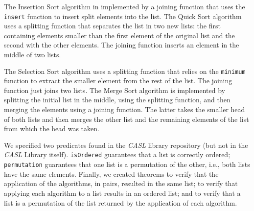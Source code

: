 \documentclass[12pt,twoside]{article}
\numberwithin{spec}{subsection}
\numberwithin{proof}{subsection}
\numberwithin{figure}{subsection}
\numberwithin{code}{subsection}
\begin{document}
The Insertion Sort algorithm in implemented by a joining function that uses the \verb.insert. function to insert split elements into the list. The Quick Sort algorithm uses a splitting function that separates the list in two new lists: the first containing elements smaller than the first element of the original list and the second with the other elements. The joining function inserts an element in the middle of two lists.

The Selection Sort algorithm uses a splitting function that relies on the \verb.minimum. function to extract the smaller element from the rest of the list. The joining function just joins two lists. The Merge Sort algorithm is implemented by splitting the initial list in the middle, using the splitting function, and then merging the elements using a joining function. The latter takes the smaller head of both lists and then merges the other list and the remaining elements of the list from which the head was taken.

We specified two predicates found in the \textit{CASL} library repository (but not in the \textit{CASL} Library itself). \verb.isOrdered. guarantees that a list is correctly ordered; \verb.permutation. guarantees that one list is a permutation of the other, i.e., both lists have the same elements. Finally, we created theorems to verify that the application of the algorithms, in pairs, resulted in the same list; to verify that applying each algorithm to a list results in an ordered list; and to verify that a list is a permutation of the list returned by the application of each algorithm.
\end{document}
